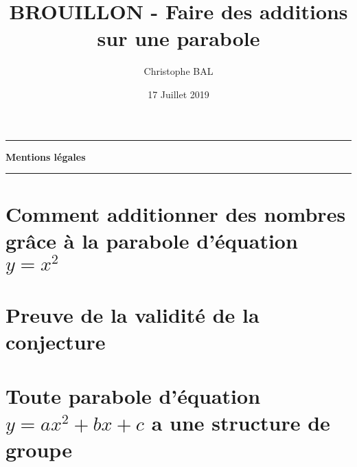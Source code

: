 \documentclass[12pt]{amsart}
\begin{document}
\title{BROUILLON - Faire des additions sur une parabole}
\author{Christophe BAL}
\date{17 Juillet 2019}
\maketitle


\begin{center}
	\hrule\vspace{.3em}
	{
		\fontsize{1.35em}{1em}\selectfont
		\textbf{Mentions \og légales \fg}
	}
			
	\vspace{0.45em}
	\doclicenseThis
	\hrule
\end{center}



\setcounter{tocdepth}{2}
\tableofcontents




\section{\texorpdfstring{Comment additionner des nombres grâce à la parabole d'équation $y = x^2$}%
                        {Comment additionner des nombres grâce à la parabole d'équation y = x**2}}





\section{Preuve de la validité de la conjecture} \label{proof}





\section{\texorpdfstring{Toute parabole d'équation $y = a x^2 + b x + c$ a une structure de groupe}%
                        {Toute parabole d'équation $y = a x**2 + b x + c$ a une structure de groupe}}
                        
                        




\end{document}
